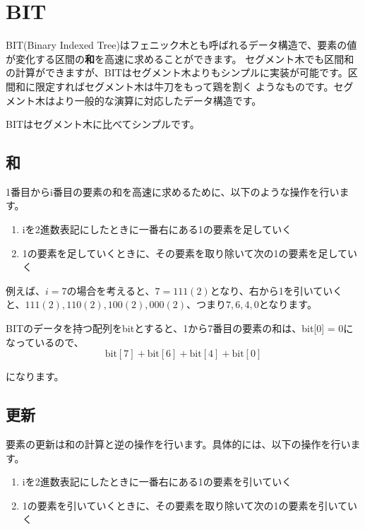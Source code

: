 \section{BIT}
BIT(Binary Indexed Tree)はフェニック木とも呼ばれるデータ構造で、要素の値が変化する区間の\textbf{和}を高速に求めることができます。
セグメント木でも区間和の計算ができますが、BITはセグメント木よりもシンプルに実装が可能です。区間和に限定すればセグメント木は牛刀をもって鶏を割く
ようなものです。セグメント木はより一般的な演算に対応したデータ構造です。

BITはセグメント木に比べてシンプルです。

\subsection{和}

1番目からi番目の要素の和を高速に求めるために、以下のような操作を行います。

\begin{enumerate}
	\item iを2進数表記にしたときに一番右にある1の要素を足していく
	\item 1の要素を足していくときに、その要素を取り除いて次の1の要素を足していく
\end{enumerate}

例えば、$i = 7$の場合を考えると、$7 = 111(2)$となり、右から1を引いていくと、$111(2), 110(2), 100(2), 000(2)$、つまり$7, 6, 4, 0$となります。

BITのデータを持つ配列をbitとすると、1から7番目の要素の和は、bit[0] = 0になっているので、
\begin{equation*}
	\text{bit}[7] + \text{bit}[6] + \text{bit}[4] + \text{bit}[0]
\end{equation*}

になります。

\subsection{更新}

要素の更新は和の計算と逆の操作を行います。具体的には、以下の操作を行います。

\begin{enumerate}
	\item iを2進数表記にしたときに一番右にある1の要素を引いていく
	\item 1の要素を引いていくときに、その要素を取り除いて次の1の要素を引いていく
\end{enumerate}

